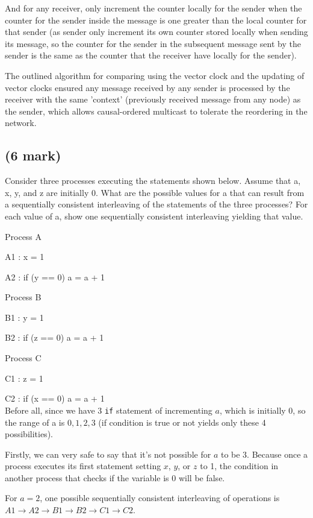 \documentclass[11pt]{article}
\begin{document}
And for any receiver, only increment the counter locally for the sender when the counter for the sender inside the message is one greater than the local counter for that sender (as sender only increment its own counter stored locally when sending its message, so the counter for the sender in the subsequent message sent by the sender is the same as the counter that the receiver have locally for the sender).

The outlined algorithm for comparing using the vector clock and the updating of vector clocks ensured any message received by any sender is processed by the receiver with the same 'context' (previously received message from any node) as the sender, which allows causal-ordered multicast to tolerate the reordering in the network.

\newpage
\subsection{(6 mark)}
Consider three processes executing the statements shown below. Assume that a, x, y, and z are initially 0. What are the possible values for a that can result from a sequentially consistent interleaving of the statements of the three processes? For each value of a, show one sequentially consistent interleaving yielding that value.

Process A

A1 : x = 1

A2 : if (y == 0) a = a + 1

Process B

B1 : y = 1

B2 : if (z == 0) a = a + 1

Process C

C1 : z = 1

C2 : if (x == 0) a = a + 1\\

Before all, since we have 3 \texttt{if} statement of incrementing $a$, which is initially 0, so the range of a is $0, 1, 2, 3$ (if condition is true or not yields only these 4 possibilities).

Firstly, we can very safe to say that it's not possible for $a$ to be $3$. Because once a process executes its first statement setting $x$, $y$, or $z$ to 1, the condition in another process that checks if the variable is 0 will be false.

For $a = 2$, one possible sequentially consistent interleaving of operations is $A1 \to A2 \to B1 \to B2 \to C1 \to C2$.
\end{document}
